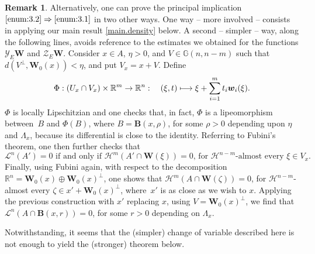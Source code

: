 \documentclass[11pt]{article}
\newcounter{cdrthm}[section]
\theoremstyle{definition}
\newtheorem{Remark}[cdrthm]{Remark}
\theoremstyle{jepanonymous}
\theoremstyle{plain}
\newcommand\mto{\mathchoice{\longmapsto}{\mapsto}{\mapsto}{\mapsto}}
\newcommand{\R}{\mathbb{R}}
\newcommand{\Rm}{\R^m}
\newcommand{\Rn}{\R^n}
\newcommand{\calH}{\mathscr{H}}
\newcommand{\calL}{\mathscr{L}}
\newcommand{\calY}{\mathscr{Y}}
\newcommand{\calZ}{\mathscr{Z}}
\newcommand{\bB}{{\boldsymbol{B}}}
\newcommand{\bW}{{\boldsymbol{W}}}
\newcommand{\bw}{{\boldsymbol{w}}}
\newcommand{\bG}{\mathbb{G}}
\begin{document}
\begin{Remark}
\label{remark}
Alternatively, one can prove the principal implication $\eqref{enum:3.2}\Rightarrow \eqref{enum:3.1}$ in two other ways.
One way -- more involved -- consists in applying our main result \ref{main.density} below.
A second -- simpler -- way, along the following lines, avoids reference to the estimates we obtained for the functions $\calY_E \bW$ and $\calZ_E \bW$.
Consider $x \in A$, $\eta > 0$, and $V \in \bG(n,n-m)$ such that $d\left(V^\perp, \bW_0(x) \right) < \eta$, and put $V_x = x + V$.
Define
\begin{equation*}
\Phi: (U_x \cap V_x) \times \Rm \to \Rn:\quad (\xi,t) \mto \xi + \sum_{i=1}^m t_i \bw_i(\xi).
\end{equation*}
$\Phi$ is locally Lipschitzian and one checks that, in fact, $\Phi$ is a lipeomorphism between~$B$ and $\Phi(B)$, where $B = \bB(x,\rho)$, for some $\rho > 0$ depending upon $\eta$ and $\Lambda_x$, because its differential is close to the identity.
Referring to Fubini's theorem, one then further checks that
\begin{equation*}
\calL^n(A') = 0 \text{ if and only if } \calH^m(A' \cap \bW(\xi)) = 0 \text{, for $\calH^{n-m}$-almost every } \xi \in V_x.
\end{equation*}
Finally, using Fubini again, with respect to the decomposition $\Rn = \bW_0(x) \oplus \bW_0(x)^\perp$, one shows that $\calH^m(A \cap \bW(\zeta))=0$, for $\calH^{n-m}$-almost every $\zeta \in x' + \bW_0(x)^\perp$, where~$x'$ is as close as we wish to $x$.
Applying the previous construction with $x'$ replacing $x$, using $V = \bW_0(x)^\perp$, we find that $\calL^n(A \cap \bB(x,r))=0$, for some $r > 0$ depending on $\Lambda_x$.
\par
Notwithstanding, it seems that the (simpler) change of variable described here is not enough to yield the (stronger) theorem below.
\end{Remark}
\end{document}
